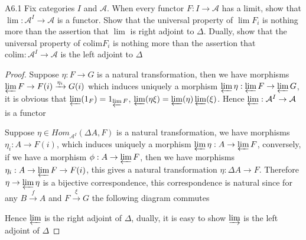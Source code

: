 \documentclass[../main.tex]{subfiles}
\begin{document}
\begin{customexercise}{A6.1}
Fix categories $I$ and $\mathcal A$. When every functor $F:I\to\mathcal A$ has a limit, show that $\lim:\mathcal A^I\to\mathcal A$ is a functor. Show that the universal property of $\lim F_i$ is nothing more than the assertion that $\lim$ is right adjoint to $\Delta$. Dually, show that the universal property of $\mathrm{colim}F_i$ is nothing more than the assertion that $\mathrm{colim}:\mathcal A^I\to\mathcal A$ is the left adjoint to $\Delta$
\end{customexercise}

\begin{proof}
Suppose $\eta:F\to G$ is a natural transformation, then we have morphisms $\displaystyle\varprojlim F\to F(i)\xrightarrow{\eta_i}G(i)$ which induces uniquely a morphism $\displaystyle\varprojlim\eta:\varprojlim F\to\varprojlim G$, it is obvious that $\varprojlim(1_F)=1_{\varprojlim F}$, $\varprojlim(\eta\xi)=\varprojlim(\eta)\varprojlim(\xi)$. Hence $\varprojlim:\mathcal A^I\to\mathcal A$ is a functor \par
Suppose $\eta\in Hom_{\mathcal A^I}(\Delta A,F)$ is a natural transformation, we have morphisms $\eta_i:A\to F(i)$, which induces uniquely a morphism $\displaystyle\varprojlim\eta:A\to\varprojlim F$, conversely, if we have a morphism $\phi:A\to\varprojlim F$, then we have morphisms $\eta_i:A\to\varprojlim F\to F(i)$, this gives a natural transformation $\eta:\Delta A\to F$. Therefore $\eta\to\varprojlim\eta$ is a bijective correspondence, this correspondence is natural since for any $B\xrightarrow{f} A$ and $F\xrightarrow{\xi} G$ the following diagram commutes
\begin{center}
\end{center}
Hence $\varprojlim$ is the right adjoint of $\Delta$, dually, it is easy to show $\varinjlim$ is the left adjoint of $\Delta$
\end{proof}
\end{document}
